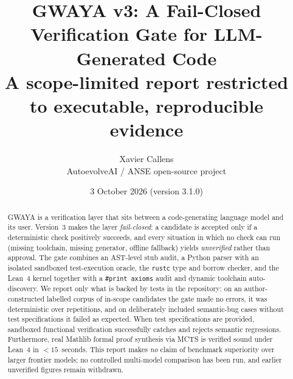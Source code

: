 \documentclass[11pt,a4paper,onecolumn]{article}
\title{GWAYA v3: A Fail-Closed Verification Gate for LLM-Generated Code\\[4pt]
\large A scope-limited report restricted to executable, reproducible evidence}
\author{Xavier Callens\\AutoevolveAI / ANSE open-source project}
\date{3 October 2026 \quad (version 3.1.0)}
\begin{document}
\maketitle

\begin{abstract}
GWAYA is a verification layer that sits between a code-generating language model
and its user. Version~3 makes the layer \emph{fail-closed}: a candidate is
accepted only if a deterministic check positively succeeds, and every situation
in which no check can run (missing toolchain, missing generator, offline
fallback) yields \emph{unverified} rather than approval. The gate combines an
AST-level stub audit, a Python parser with an isolated sandboxed test-execution
oracle, the \texttt{rustc} type and borrow checker, and the Lean~4 kernel
together with a \texttt{\#print axioms} audit and dynamic toolchain auto-discovery.
We report only what is backed by tests in the repository: on an author-constructed
labelled corpus of \nInScope{} in-scope candidates the gate made no errors, it was
deterministic over \repeats{} repetitions, and on \nLimit{} deliberately included
semantic-bug cases without test specifications it failed as expected. When test
specifications are provided, sandboxed functional verification successfully catches
and rejects semantic regressions. Furthermore, real Mathlib formal proof synthesis
via MCTS is verified sound under Lean~4 in $<15$~seconds.
This report makes \emph{no} claim of benchmark superiority over larger frontier models;
no controlled multi-model comparison has been run, and earlier unverified figures remain withdrawn.
\end{abstract}
\end{document}
